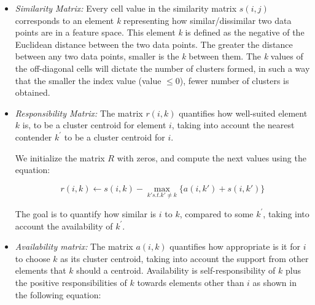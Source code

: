 \begin{itemize}

  \item\textit{Similarity Matrix:}
  Every cell value in the similarity matrix $s(i,j)$ corresponds to an element \textit{k} representing how similar/dissimilar two data points are in a feature space. This element \textit{k} is defined as the negative of the Euclidean distance between the two data points. The greater the distance between any two data points, smaller is the \textit{k} between them. The \textit{k} values of the off-diagonal cells will dictate the number of clusters formed, in such a way that the smaller the index value (value	$\leq$0), fewer number of clusters is obtained.
  \item\textit{Responsibility Matrix:} The matrix $r(i , k)$ quantifies how well-suited element $k$ is, to be a cluster centroid for element $i$, taking into account the nearest contender $k^{\prime}$ to be a cluster centroid for $i$.
  
  We initialize the matrix $R$ with zeros, and compute the next values using the equation:

    \begin{equation}
        r(i, k) \leftarrow s(i, k) - \max\limits_{k' s.t. k' \neq k}\{ a(i, k') + s(i, k') \}
    \end{equation}
 
 The goal is to quantify how similar is $i$ to $k$, compared to some $k^{\prime}$, taking into account the availability of $k^{\prime}$.   
    
  \item\textit{Availability matrix:} The matrix $a(i,k)$ quantifies how appropriate is it for $i$ to choose $k$ as its cluster centroid, taking into account the support from other elements that $k$ should a centroid. Availability is self-responsibility of $k$ plus the positive responsibilities of $k$ towards elements other than $i$ as shown in the following equation:
  

\end{itemize}
